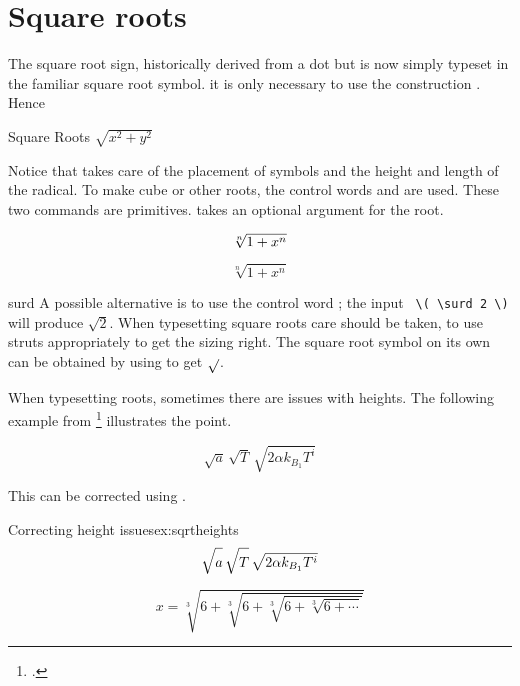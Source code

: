 \section{Square roots}

The square root sign, historically derived from a dot but is now simply typeset in the familiar square root symbol.  it is only necessary to use the construction . Hence

\begin{texexample}{Square Roots}{}
$\sqrt{x^2+y^2}$
\end{texexample}


Notice that \tex takes care of the placement of
symbols and the height and length of the radical. To make cube or other roots, the control
words  and  are used. These two commands are \tex primitives. \latexe
{} takes an optional argument for the root.

\begin{texexample}{}{}
   \[\root n \of  {1+x^n}\]
   
   \[\sqrt[n]{1+x^n}\]
\end{texexample}

\begin{docCmd}{surd}{}
 A possible alternative is to use the control word ; the input  \verb+ \( \surd 2 \)+ will
produce \(\surd 2\). When typesetting square roots care should be taken, to use struts appropriately to get the sizing right. The square root symbol on its own can be obtained by using
 to get $\sqrtsign{}$.
\end{docCmd}

When typesetting roots, sometimes there are issues with heights. The following example
from \footcite{mathmode} illustrates the point.

\begin{equation}
 \sqrt{a}\,%
 \sqrt{T}\,%
 \sqrt{2\alpha k_{B_1}T^i}\label{eq:root1}
\end{equation}

This can be corrected using . 

\begin{texexample}{Correcting height issues}{ex:sqrtheights}
\begin{equation}\label{eq:root2}
 \sqrt{a\vphantom{k_{B_1}T^i}}\,%
 \sqrt{T\vphantom{k_{B_1}T^i}}\,%
 \sqrt{2\alpha k_{B_1}T^i}
\end{equation}

\begin{equation}
x = \sqrt[3]{6+\sqrt[3]{6+\sqrt[3]{6+\sqrt[3]{6+\cdots}}}}
\end{equation}
\end{texexample}

